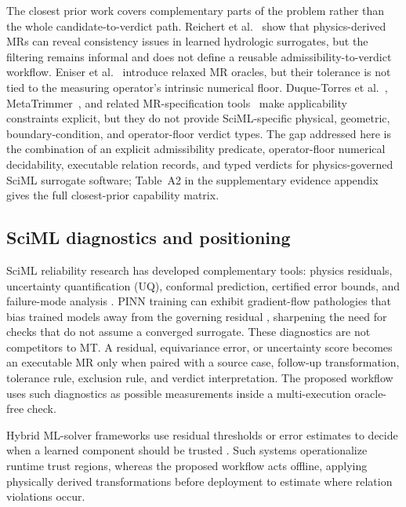 \documentclass[preprint,12pt]{elsarticle}
\begin{document}
The closest prior work covers complementary parts of the problem rather than the whole candidate-to-verdict path. Reichert et al.~\citep{reichert2024hess} show that physics-derived MRs can reveal consistency issues in learned hydrologic surrogates, but the filtering remains informal and does not define a reusable admissibility-to-verdict workflow. Eniser et al.~\citep{eniser2022relaxations} introduce relaxed MR oracles, but their tolerance is not tied to the measuring operator's intrinsic numerical floor. Duque-Torres et al.~\citep{duqueTorres2023bugornot,duqueTorres2023completePipeline,duqueTorres2024selecting}, MetaTrimmer~\citep{duqueTorres2023metaTrimmer}, and related MR-specification tools~\citep{sun2026ccml} make applicability constraints explicit, but they do not provide SciML-specific physical, geometric, boundary-condition, and operator-floor verdict types. The gap addressed here is the combination of an explicit admissibility predicate, operator-floor numerical decidability, executable relation records, and typed verdicts for physics-governed SciML surrogate software; Table~A2 in the supplementary evidence appendix gives the full closest-prior capability matrix.

\subsection{SciML diagnostics and positioning}
\label{subsec:sciml-vv}
\label{subsec:hybrid-trust}
\label{subsec:new-not-new}

SciML reliability research has developed complementary tools: physics residuals, uncertainty quantification (UQ), conformal prediction, certified error bounds, and failure-mode analysis \citep{raissi2019pinn,karniadakis2021piml,li2021fno,krishnapriyan2021failure,gopakumar2025calibrated}. PINN training can exhibit gradient-flow pathologies that bias trained models away from the governing residual \citep{wang2021gradflow,krishnapriyan2021failure}, sharpening the need for checks that do not assume a converged surrogate. These diagnostics are not competitors to MT. A residual, equivariance error, or uncertainty score becomes an executable MR only when paired with a source case, follow-up transformation, tolerance rule, exclusion rule, and verdict interpretation. The proposed workflow uses such diagnostics as possible measurements inside a multi-execution oracle-free check.

Hybrid ML-solver frameworks use residual thresholds or error estimates to decide when a learned component should be trusted \citep{baral2025xrepit,wang2025deeponetfe}. Such systems operationalize runtime trust regions, whereas the proposed workflow acts offline, applying physically derived transformations before deployment to estimate where relation violations occur.
\end{document}
